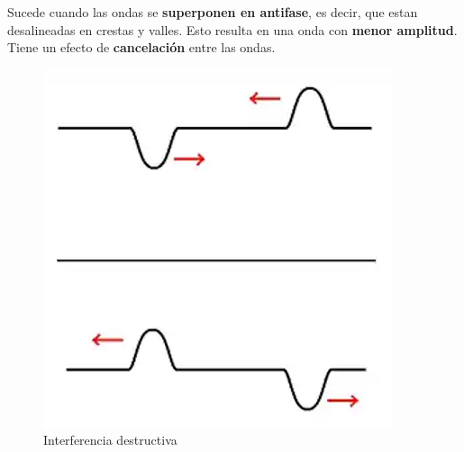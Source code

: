 Sucede cuando las ondas se \textbf{superponen en antifase}, es decir, que estan desalineadas en crestas y valles. Esto resulta en una onda con \textbf{menor amplitud}. Tiene un efecto de \textbf{cancelación} entre las ondas.

\begin{figure}[H]
  \centering
  \includegraphics[scale=0.4]{imagenes/interferencia_destructiva.png}
  \caption{Interferencia destructiva\cite{respaionterf}}
\end{figure}
